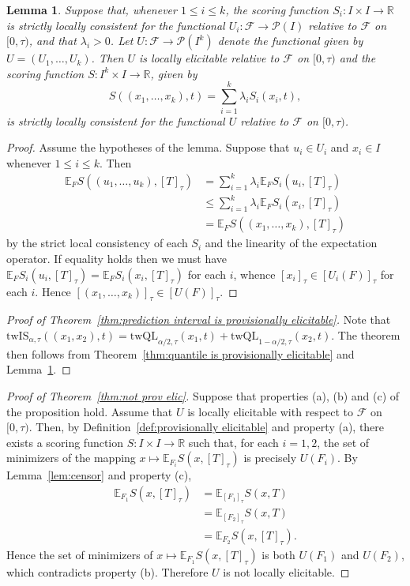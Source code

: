 \documentclass[10pt]{article} %
\theoremstyle{theorem}
\newtheorem{lem}{Lemma}
\theoremstyle{definition}
\newcommand{\RRR}{\mathbb{R}}
\newcommand{\EEE}{\mathbb{E}}
\newcommand{\twQL}{\mathrm{twQL}}
\newcommand{\twIS}{\mathrm{twIS}}
\begin{document}
\begin{lem}\label{lem:vector valued functional}
Suppose that, whenever $1\leq i\leq k$, the scoring function $S_i:I\times I\to\RRR$ is strictly locally consistent for the functional $U_i:\mathcal{F}\to\mathcal{P}(I)$ relative to $\mathcal{F}$ on $[0,\tau)$, and that $\lambda_i>0$. Let $U:\mathcal{F}\to\mathcal{P}(I^k)$ denote the functional given by $U=(U_1,\ldots,U_k)$. Then $U$ is locally elicitable relative to $\mathcal{F}$ on $[0,\tau)$ and the scoring function $S:I^k\times I \to \RRR$, given by
\[S((x_1, \ldots, x_k), t) = \sum_{i=1}^k \lambda_i S_i(x_i,t),\]
is strictly locally consistent for the functional $U$ relative to $\mathcal{F}$ on $[0,\tau)$.
\end{lem}

\begin{proof}
Assume the hypotheses of the lemma. Suppose that $u_i\in U_i$ and $x_i\in I$ whenever $1\leq i\leq k$. Then
\begin{align*}
\EEE_F S((u_1, \ldots, u_k), [T]_\tau)
&=  \sum_{i=1}^k \lambda_i \EEE_F S_i(u_i, [T]_\tau) \\
&\leq  \sum_{i=1}^k \lambda_i \EEE_F S_i(x_i, [T]_\tau) \\
&= \EEE_F S((x_1, \ldots, x_k), [T]_\tau)
\end{align*}
by the strict local consistency of each $S_i$ and the linearity of the expectation operator. If equality holds then we must have $\EEE_F S_i(u_i, [T]_\tau) = \EEE_F S_i(x_i, [T]_\tau)$ for each $i$, whence $[x_i]_\tau \in [U_i(F)]_\tau$ for each $i$. Hence $[(x_1,\ldots,x_k)]_\tau \in [U(F)]_\tau$.
\end{proof}

\begin{proof}[Proof of Theorem~\ref{thm:prediction interval is provisionally elicitable}]
Note that $\twIS_{\alpha,\tau}((x_1,x_2), t)=\twQL_{\alpha/2,\tau}(x_1,t)+\twQL_{1-\alpha/2,\tau}(x_2,t)$. The theorem then follows from Theorem~\ref{thm:quantile is provisionally elicitable} and Lemma~\ref{lem:vector valued functional}.
\end{proof}

\begin{proof}[Proof of Theorem~\ref{thm:not prov elic}]
Suppose that properties (a), (b) and (c) of the proposition hold. Assume that $U$ is locally elicitable with respect to $\mathcal{F}$ on $[0,\tau)$. Then, by Definition~\ref{def:provisionally elicitable} and property (a), there exists a scoring function $S: I\times I\to \RRR$ such that, for each $i=1,2$, the set of minimizers of the mapping $x\mapsto \EEE_{F_i}S(x,[T]_\tau)$ is precisely $U(F_i)$. By Lemma~\ref{lem:censor} and property (c),
\begin{align*}
\EEE_{F_1}S(x,[T]_\tau)
&=\EEE_{[F_1]_\tau}S(x,T) \\
&=\EEE_{[F_2]_\tau}S(x,T) \\
&=\EEE_{F_2}S(x,[T]_\tau).
\end{align*}
Hence the set of minimizers of $x\mapsto \EEE_{F_1}S(x,[T]_\tau)$ is both $U(F_1)$ and $U(F_2)$, which contradicts property (b). Therefore $U$ is not locally elicitable.
\end{proof}
\end{document}
